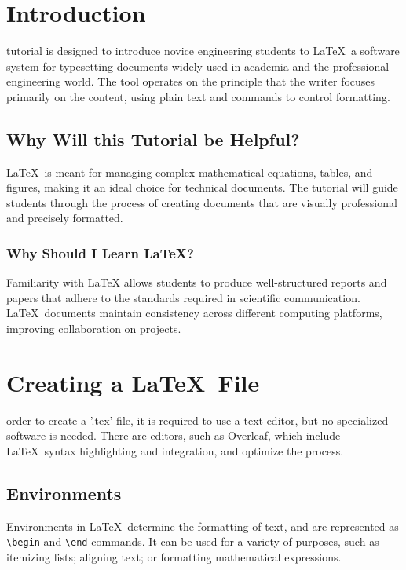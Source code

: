 \documentclass[12pt,journal,compsoc]{IEEEtran}
\begin{document}
\section{Introduction}

 tutorial is designed to introduce novice engineering students to \LaTeX\, a software system for typesetting documents widely used in academia and the professional engineering world. The tool operates on the principle that the writer focuses primarily on the content, using plain text and commands to control formatting.

\subsection{Why Will this Tutorial be Helpful?}
\LaTeX\ is meant for managing complex mathematical equations, tables, and figures, making it an ideal choice for technical documents. The tutorial will guide students through the process of creating documents that are visually professional and precisely formatted.

\subsubsection{Why Should I Learn \LaTeX{}?}
Familiarity with LaTeX allows students to produce well-structured reports and papers that adhere to the standards required in scientific communication. \LaTeX\ documents maintain consistency across different computing platforms, improving collaboration on projects. 

\section{Creating a \LaTeX\ File}
 order to create a '.tex' file, it is required to use a text editor, but no specialized software is needed. There are editors, such as Overleaf, which include \LaTeX\ syntax highlighting and integration, and optimize the process.

\subsection{Environments}

Environments in \LaTeX\ determine the formatting of text, and are represented as \texttt{\textbackslash begin} and \texttt{\textbackslash end} commands. It can be used for a variety of purposes, such as itemizing lists; aligning text; or formatting mathematical expressions.
\end{document}
